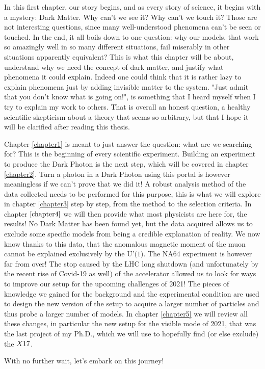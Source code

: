In this first chapter, our story begins, and as every story of science, it begins with a mystery: Dark Matter. Why can't we see it? Why can't we touch it? Those are not interesting questions, since many well-understood phenomena can't be seen or touched. In the end, it all boils down to one question: why our models, that work so amazingly well in so many different situations, fail miserably in other situations apparently equivalent? This is what this chapter will be about, understand why we need the concept of dark matter, and justify what phenomena it could explain. Indeed one could think that it is rather lazy to explain phenomena just by adding invisible matter to the system. "Just admit that you don't know what is going on!", is something that I heard myself when I try to explain my work to others. That is overall an honest question, a healthy scientific skepticism about a theory that seems so arbitrary, but that I hope it will be clarified after reading this thesis.

Chapter \ref{chapter1} is meant to just answer the question: what are we searching for? This is the beginning of every scientific experiment. Building an experiment to produce the Dark Photon is the next step, which will be covered in chapter \ref{chapter2}. Turn a photon in a Dark Photon using this portal is however meaningless if we can't prove that we did it! A robust analysis method of the data collected needs to be performed for this purpose, this is what we will explore in chapter \ref{chapter3} step by step, from the method to the selection criteria. In chapter $\ref{chapter4}$ we will then provide what most physicists are here for, the results! No Dark Matter has been found yet, but the data acquired allows us to exclude some specific models from being a credible explanation of reality. We now know thanks to this data, that the anomalous magnetic moment of the muon cannot be explained exclusively by the $\textrm{U'(1)}$. The NA64 experiment is however far from over! The stop caused by the LHC long shutdown (and unfortunately by the recent rise of Covid-19 as well) of the accelerator allowed us to look for ways to improve our setup for the upcoming challenges of 2021! The pieces of knowledge we gained for the background and the experimental condition are used to design the new version of the setup to acquire a larger number of particles and thus probe a larger number of models. In chapter \ref{chapter5} we will review all these changes, in particular the new setup for the visible mode of 2021, that was the last project of my Ph.D., which we will use to hopefully find (or else exclude) the $X17$.

With no further wait, let's embark on this journey!

